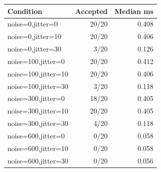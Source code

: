 \begin{tabular}{lrr}
\toprule
Condition & Accepted & Median ms \\
\midrule
noise=0,jitter=0 & 20/20 & 0.408 \\
noise=0,jitter=10 & 20/20 & 0.406 \\
noise=0,jitter=30 & 3/20 & 0.126 \\
noise=100,jitter=0 & 20/20 & 0.412 \\
noise=100,jitter=10 & 20/20 & 0.406 \\
noise=100,jitter=30 & 3/20 & 0.118 \\
noise=300,jitter=0 & 18/20 & 0.405 \\
noise=300,jitter=10 & 20/20 & 0.405 \\
noise=300,jitter=30 & 4/20 & 0.118 \\
noise=600,jitter=0 & 0/20 & 0.058 \\
noise=600,jitter=10 & 0/20 & 0.058 \\
noise=600,jitter=30 & 0/20 & 0.056 \\
\bottomrule
\end{tabular}
